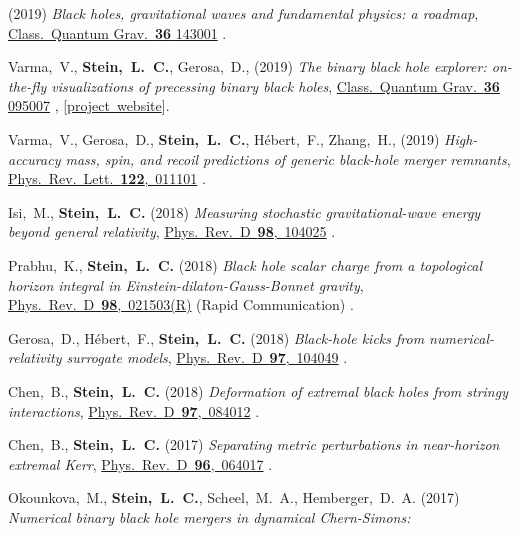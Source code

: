 \begin{etaremune}[start=\value{pubCounter}]
  (2019)
  {\it Black holes, gravitational waves and fundamental physics: a roadmap},
  \href{https://doi.org/10.1088/1361-6382/ab0587}{Class.~Quantum Grav.~{\bf 36} 143001}
  .
\item
  Varma,~V., {\bf Stein,~L.~C.}, Gerosa,~D.,
  (2019)
  {\it The binary black hole explorer: on-the-fly visualizations of precessing binary black holes},
  \href{https://doi.org/10.1088/1361-6382/ab0ee9}{Class.~Quantum Grav.~{\bf 36} 095007}
  ,
  [\href{https://vijayvarma392.github.io/binaryBHexp/}{project~website}].
\item
  Varma,~V., Gerosa,~D., {\bf Stein,~L.~C.}, H\'ebert,~F.,  Zhang,~H.,
  (2019)
  {\it High-accuracy mass, spin, and recoil predictions of generic black-hole merger remnants},
  \href{https://doi.org/10.1103/PhysRevLett.122.011101}{Phys.~Rev.~Lett.~{\bf 122},~011101}
  .
\item
  Isi,~M., {\bf Stein,~L.~C.}
  (2018)
  {\it Measuring stochastic gravitational-wave energy beyond general relativity},
  \href{https://doi.org/10.1103/PhysRevD.98.104025}{Phys.~Rev.~D~{\bf 98},~104025}
  .
\item
  Prabhu,~K., {\bf Stein,~L.~C.}
  (2018)
  {\it Black hole scalar charge from a topological horizon integral in
    Einstein-dilaton-Gauss-Bonnet gravity},
  \href{https://doi.org/10.1103/PhysRevD.98.021503}{Phys.~Rev.~D~{\bf 98},~021503(R)}
  (Rapid Communication)
  .
\item
  Gerosa,~D., H\'ebert,~F., {\bf Stein,~L.~C.}
  (2018)
  {\it Black-hole kicks from numerical-relativity surrogate models},
  \href{https://doi.org/10.1103/PhysRevD.97.104049}{Phys.~Rev.~D~{\bf 97},~104049}
  .
\item
  Chen,~B., {\bf Stein,~L.~C.}
  (2018)
  {\it Deformation of extremal black holes from stringy interactions},
  \href{https://doi.org/10.1103/PhysRevD.97.084012}{Phys.~Rev.~D~{\bf 97},~084012}
  .
\item
  Chen,~B., {\bf Stein,~L.~C.}
  (2017)
  {\it Separating metric perturbations in near-horizon extremal Kerr},
  \href{https://doi.org/10.1103/PhysRevD.96.064017}{Phys.~Rev.~D~{\bf 96},~064017}
  .
\item
  Okounkova,~M.,
  {\bf Stein,~L.~C.},
  Scheel,~M.~A.,
  Hemberger,~D.~A.
  (2017)
  {\it Numerical binary black hole mergers in dynamical Chern-Simons:
}
\end{etaremune}
